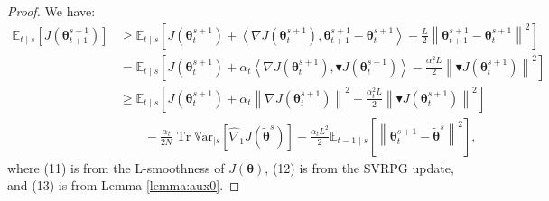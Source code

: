 \documentclass{article}
\theoremstyle{remark}
\theoremstyle{definition}
\DeclareMathOperator{\Tr}{Tr}
\newcommand{\norm}[2][\infty]{\left\|#2\right\|_{#1}}
\newcommand{\dotprod}[2]{\left\langle#1,#2\right\rangle}
\newcommand{\vtheta}{\boldsymbol{\theta}}
\newcommand{\gradJ}[1]{\nabla J(#1)}
\newcommand{\gradApp}[2]{\hat{\nabla}_{#2}J(#1)}
\newcommand{\Ets}[2][t]{\mathbb{E}_{#1\mid s}\left[#2\right]}
\newcommand{\Varts}[2][t]{{\mathbb{V}\text{ar}}_{#1\mid s}\left[#2\right]}
\newcommand{\gradBlack}[1]{\blacktriangledown J(#1)}
\begin{document}
\begin{proof}
	We have:
	\begin{align}
	\Ets{J(\vtheta_{t+1}^{s+1})} 
	&\geq \Ets{J(\vtheta_t^{s+1})+\dotprod{\gradJ{\vtheta_t^{s+1}}}{\vtheta_{t+1}^{s+1}-\vtheta_t^{s+1}} - \frac{L}{2}\norm[]{\vtheta_{t+1}^{s+1}-\vtheta_t^{s+1}}^2} \\
	&= \Ets{J(\vtheta_t^{s+1})+\alpha_t\dotprod{\gradJ{\vtheta_t^{s+1}}}{\gradBlack{\vtheta_t^{s+1}}} - \frac{\alpha_t^2L}{2}\norm[]{\gradBlack{\vtheta_t^{s+1}}}^2} \\
	&\geq
	\Ets{J(\vtheta_t^{s+1})+\alpha_t\norm[]{\gradJ{\vtheta_t^{s+1}}}^2 - \frac{\alpha_t^2L}{2}\norm[]{\gradBlack{\vtheta_t^{s+1}}}^2} \nonumber\\
	&\qquad-
	\frac{\alpha_t}{2N}\Tr\Varts[]{\gradApp{\tilde{\vtheta}^s}{1}} -\frac{\alpha_tL^2}{2}\Ets[t-1]{\norm[]{\vtheta_t^{s+1} - \tilde{\vtheta}^s}^2},
\end{align}
where (11) is from the L-smoothness of $J(\vtheta)$, (12) is from the SVRPG update, and (13) is from Lemma \ref{lemma:aux0}.


\end{proof}
\end{document}
